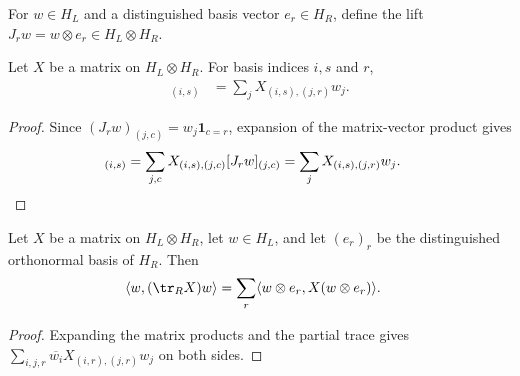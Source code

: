\begin{definition}
    \label{def:single_basis_vector_lift}
    \leanok
    For $w\in H_L$ and a distinguished basis vector $e_r\in H_R$, define the
    lift $J_r w=w\otimes e_r\in H_L\otimes H_R$.
\end{definition}

\begin{theorem}
    \label{thm:matrix_action_single_basis_vector_lift}
    \leanok
    Let $X$ be a matrix on $H_L\otimes H_R$. For basis indices $i,s$ and $r$,
    \begin{align}
        [XJ_r w]_{(i,s)}
        &=\sum_j X_{(i,s),(j,r)}w_j.
        \label{eq:entropy_lift_action}
    \end{align}
\end{theorem}

\begin{proof}\leanok
    Since $(J_r w)_{(j,c)}=w_j\mathbf 1_{c=r}$, expansion of the
    matrix-vector product gives
    \begin{align}
        [XJ_r w]_{(i,s)}
        &=\sum_{j,c}X_{(i,s),(j,c)}[J_r w]_{(j,c)}
          =\sum_j X_{(i,s),(j,r)}w_j.
        \notag
    \end{align}
\end{proof}

\begin{theorem}
    \label{thm:partial_trace_quadratic_form_split}
    \leanok
    Let $X$ be a matrix on $H_L\otimes H_R$, let $w\in H_L$, and let
    $(e_r)_r$ be the distinguished orthonormal basis of $H_R$. Then
    \begin{align}
        \langle w,(\tr_R X)w\rangle
        &=\sum_r\langle w\otimes e_r,X(w\otimes e_r)\rangle.
        \label{eq:entropy_partial_trace_qform}
    \end{align}
\end{theorem}

\begin{proof}\leanok
    Expanding the matrix products and the partial trace gives
    $\sum_{i,j,r}\overline{w_i}X_{(i,r),(j,r)}w_j$ on both sides.
\end{proof}

